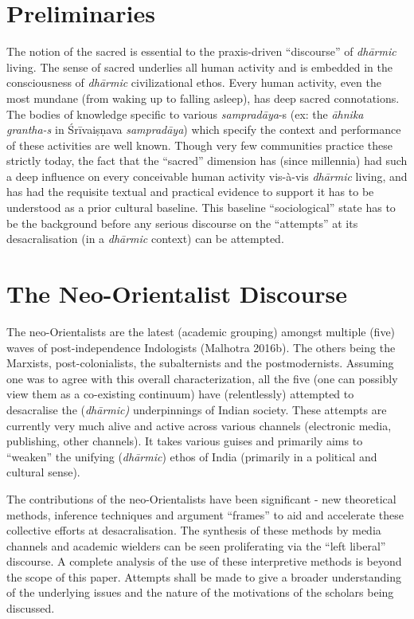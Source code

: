 \section*{Preliminaries}

The notion of the sacred is essential to the praxis-driven “discourse” of \textit{dhārmic} living. The sense of sacred underlies all human activity and is embedded in the consciousness of \textit{dhārmic} civilizational ethos. Every human activity, even the most mundane (from waking up to falling asleep), has deep sacred connotations. The bodies of knowledge specific to various \textit{sampradāya}-s (ex: the \textit{āhnika grantha-s }in Śrīvaiṣṇava \textit{sampradāya}) which specify the context and performance of these activities are well known. Though very few communities practice these strictly today, the fact that the “sacred” dimension has (since millennia) had such a deep influence on every conceivable human activity vis-à-vis \textit{dhārmic} living, and has had the requisite textual and practical evidence to support it has to be understood as a prior cultural baseline. This baseline “sociological” state has to be the background before any serious discourse on the “attempts” at its desacralisation (in a \textit{dhārmic} context) can be attempted.


\section*{The Neo-Orientalist Discourse}

The neo-Orientalists are the latest (academic grouping) amongst multiple (five) waves of post-independence Indologists (Malhotra 2016b). The others being the Marxists, post-colonialists, the subalternists and the postmodernists. Assuming one was to agree with this overall characterization, all the five (one can possibly view them as a co-existing continuum) have (relentlessly) attempted to desacralise the (\textit{dhārmic)} underpinnings of Indian society. These attempts are currently very much alive and active across various channels (electronic media, publishing, other channels). It takes various guises and primarily aims to “weaken” the unifying (\textit{dhārmic}) ethos of India (primarily in a political and cultural sense).

The contributions of the neo-Orientalists have been significant - new theoretical methods, inference techniques and argument “frames” to aid and accelerate these collective efforts at desacralisation. The synthesis of these methods by media channels and academic wielders can be seen proliferating via the “left liberal” discourse. A complete analysis of the use of these interpretive methods is beyond the scope of this paper. Attempts shall be made to give a broader understanding of the underlying issues and the nature of the motivations of the scholars being discussed.

